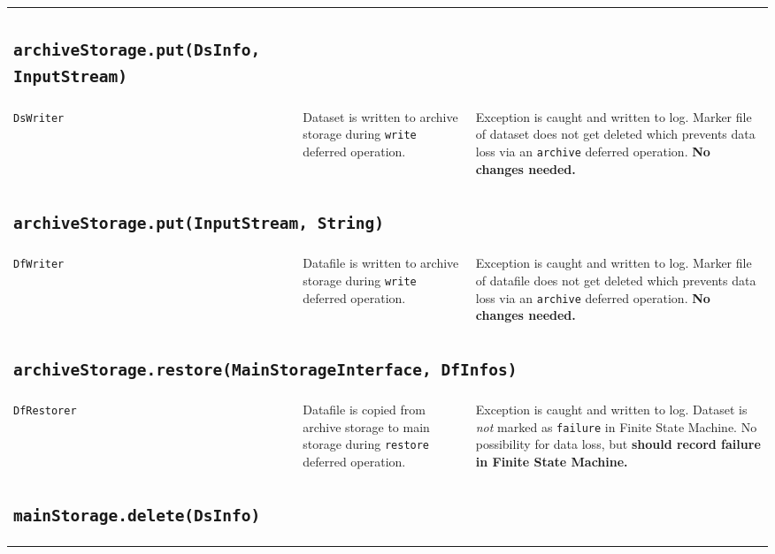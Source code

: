 \documentclass[paper=a4]{scrartcl}
\begin{document}
\begin{longtable}{ p{32mm} | p{48mm} | p{48mm} }
{      \subsection{\texttt{archiveStorage.put(DsInfo, InputStream)}}
    } \\

    \raggedright \texttt{DsWriter} &
    \raggedright Dataset is written to archive storage during \texttt{write} deferred operation. &
    \raggedright Exception is caught and written to log. Marker file of dataset does not get deleted which prevents data loss via an \texttt{archive} deferred operation. \textbf{No changes needed.}
    \tabularnewline

    \multicolumn{3}{p{\textwidth}}{
      \subsection{\texttt{archiveStorage.put(InputStream, String)}}
    } \\

    \raggedright \texttt{DfWriter} &
    \raggedright Datafile is written to archive storage during \texttt{write} deferred operation. &
    \raggedright Exception is caught and written to log. Marker file of datafile does not get deleted which prevents data loss via an \texttt{archive} deferred operation. \textbf{No changes needed.}
    \tabularnewline

    \multicolumn{3}{p{\textwidth}}{
      \subsection{\texttt{archiveStorage.restore(MainStorageInterface, DfInfos)}}
    } \\

    \raggedright \texttt{DfRestorer} &
    \raggedright Datafile is copied from archive storage to main storage during \texttt{restore} deferred operation. &
    \raggedright Exception is caught and written to log. Dataset is \textit{not} marked as \texttt{failure} in Finite State Machine. No possibility for data loss, but \textbf{should record failure in Finite State Machine.}
    \tabularnewline

    \multicolumn{3}{p{\textwidth}}{
      \subsection{\texttt{mainStorage.delete(DsInfo)}}
    } \\


\end{longtable}
\end{document}
